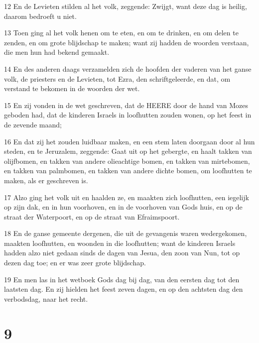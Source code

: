 \par 12 En de Levieten stilden al het volk, zeggende: Zwijgt, want deze dag is heilig, daarom bedroeft u niet.
\par 13 Toen ging al het volk henen om te eten, en om te drinken, en om delen te zenden, en om grote blijdschap te maken; want zij hadden de woorden verstaan, die men hun had bekend gemaakt.
\par 14 En des anderen daags verzamelden zich de hoofden der vaderen van het ganse volk, de priesters en de Levieten, tot Ezra, den schriftgeleerde, en dat, om verstand te bekomen in de woorden der wet.
\par 15 En zij vonden in de wet geschreven, dat de HEERE door de hand van Mozes geboden had, dat de kinderen Israels in loofhutten zouden wonen, op het feest in de zevende maand;
\par 16 En dat zij het zouden luidbaar maken, en een stem laten doorgaan door al hun steden, en te Jeruzalem, zeggende: Gaat uit op het gebergte, en haalt takken van olijfbomen, en takken van andere olieachtige bomen, en takken van mirtebomen, en takken van palmbomen, en takken van andere dichte bomen, om loofhutten te maken, als er geschreven is.
\par 17 Alzo ging het volk uit en haalden ze, en maakten zich loofhutten, een iegelijk op zijn dak, en in hun voorhoven, en in de voorhoven van Gods huis, en op de straat der Waterpoort, en op de straat van Efraimspoort.
\par 18 En de ganse gemeente dergenen, die uit de gevangenis waren wedergekomen, maakten loofhutten, en woonden in die loofhutten; want de kinderen Israels hadden alzo niet gedaan sinds de dagen van Jesua, den zoon van Nun, tot op dezen dag toe; en er was zeer grote blijdschap.
\par 19 En men las in het wetboek Gods dag bij dag, van den eersten dag tot den laatsten dag. En zij hielden het feest zeven dagen, en op den achtsten dag den verbodsdag, naar het recht.

\chapter{9}

